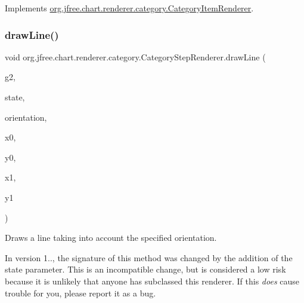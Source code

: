 Implements \mbox{\hyperlink{interfaceorg_1_1jfree_1_1chart_1_1renderer_1_1category_1_1_category_item_renderer_ac18a046a47d2b991ab2c968ce3363aea}{org.\+jfree.\+chart.\+renderer.\+category.\+Category\+Item\+Renderer}}.

\mbox{\label{classorg_1_1jfree_1_1chart_1_1renderer_1_1category_1_1_category_step_renderer_a237a892add4b58f7594f96d6dc87fbe5}} 
\subsubsection{\texorpdfstring{draw\+Line()}{drawLine()}}
{\footnotesize\ttfamily void org.\+jfree.\+chart.\+renderer.\+category.\+Category\+Step\+Renderer.\+draw\+Line (\begin{DoxyParamCaption}\item[{Graphics2D}]{g2,  }\item[{State}]{state,  }\item[{\mbox{\hyperlink{classorg_1_1jfree_1_1chart_1_1plot_1_1_plot_orientation}{Plot\+Orientation}}}]{orientation,  }\item[{double}]{x0,  }\item[{double}]{y0,  }\item[{double}]{x1,  }\item[{double}]{y1 }\end{DoxyParamCaption})\hspace{0.3cm}{\ttfamily [protected]}}

Draws a line taking into account the specified orientation. 

In version 1.., the signature of this method was changed by the addition of the \textquotesingle{}state\textquotesingle{} parameter. This is an incompatible change, but is considered a low risk because it is unlikely that anyone has subclassed this renderer. If this {\itshape does} cause trouble for you, please report it as a bug.


